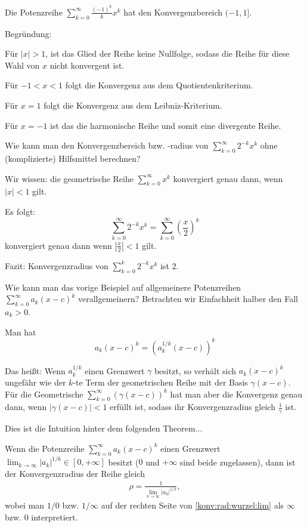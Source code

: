 \begin{bsp} 
	Die Potenzreihe $\sum_{k=0}^\infty \frac{(-1)^k}{k} x^k$ hat den Konvergenzbereich $(-1,1]$.  
	
	Begründung: 
	\begin{enuma}
		\item Für $|x| > 1$, ist das Glied der Reihe keine Nullfolge, sodass die Reihe für diese Wahl von $x$ nicht konvergent ist. 
		\item Für $-1 < x < 1$ folgt die Konvergenz aus dem Quotientenkriterium. 
		\item Für $x=1$ folgt die Konvergenz aus dem Leibniz-Kriterium. 
		\item Für $x=-1$ ist das die harmonische Reihe und somit eine divergente Reihe. 
	\end{enuma} 
\end{bsp} 

\begin{bsp} 
	Wie kann man den Konvergenzbereich bzw. -radius von $\sum_{k=0}^\infty 2^{-k} x^k$ ohne (komplizierte) Hilfsmittel berechnen? 
	
	
	Wir wissen: die geometrische Reihe $\sum_{k=0}^\infty x^k$ konvergiert genau dann, wenn $|x| < 1$ gilt. 
	
	Es folgt: 
	\[
		\sum_{k=0}^\infty 2^{-k} x^k = \sum_{k=0}^\infty \left( \frac{x}{2}\right)^k
	\]
	konvergiert genau dann wenn $\left| \frac{x}{2} \right|  < 1$ gilt. 

	Fazit: Konvergenzradius von $\sum_{k=0}^k 2^{-k} x^k$ ist $2$. 
\end{bsp} 

\begin{bem} 
	Wie kann man das vorige Beispiel auf allgemeinere Potenzreihen $\sum_{k=0}^\infty a_k (x-c)^k$ verallgemeinern? Betrachten wir Einfachheit halber den Fall $a_k > 0$. 
	
	Man hat 
	\[
		 a_k (x-c)^k   = \left( a_k^{1/k} (x-c) \right)^k
	\] 
	
	Das heißt: Wenn $a_k^{1/k}$ einen Grenzwert $\gamma$ besitzt, so verhält sich $a_k (x-c)^k$ ungefähr wie der $k$-te Term der geometrischen Reihe mit der Basis $\gamma (x-c)$. Für die Geometrische $\sum_{k=0}^\infty (\gamma (x-c))^k$ hat man aber die Konvergenz genau dann, wenn $|\gamma (x-c)| < 1$ erfüllt ist, sodass ihr Konvergenzradius gleich $\frac{1}{\gamma}$ ist. 
	
	Dies ist die Intuition hinter dem folgenden Theorem...
\end{bem} 

\begin{thm}
	Wenn die Potenzreihe $\sum_{k=0}^\infty a_k (x-c)^k$ einen Grenzwert $\lim_{k \to \infty} |a_k|^{1/k} \in [0,+\infty]$ besitzt ($0$ und $+\infty$ sind beide zugelassen), dann ist der Konvergenzradius der Reihe gleich 
	\begin{align}
		\label{konv:rad:wurzel:lim}
		\rho = \frac{1}{ \lim_{k \to \infty} |a_k|^{1/k}},
	\end{align}
	wobei man $1/0$ bzw. $1/\infty$ auf der rechten Seite von \eqref{konv:rad:wurzel:lim} als $\infty$ bzw. $0$ interpretiert. 
\end{thm} 


